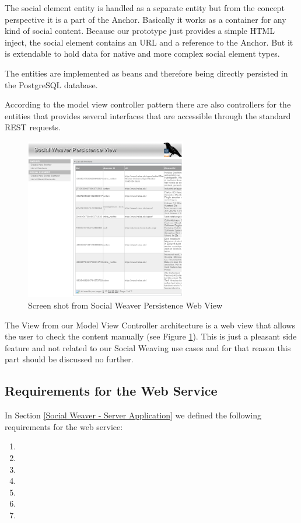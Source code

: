 The social element entity is handled as a separate entity but from the concept perspective it is a part of the Anchor. Basically it works as a container for any kind of social content. Because our prototype just provides a simple HTML inject, the social element contains an URL and a reference to the Anchor. But it is extendable to hold data for native and more complex social element types. 

The entities are implemented as beans and therefore being directly persisted in the PostgreSQL database.

According to the model view controller pattern there are also controllers for the entities that provides several interfaces that are accessible through the standard REST requests. 

\begin{figure}\centering
		\includegraphics[width=7cm]{images/sowe-mvc-view-screenshot.png}
		\caption{Screen shot from Social Weaver Persistence Web View}
		\label{sowe-mvc-view-screenshot}
\end{figure} 

The View from our Model View Controller architecture is a web view that allows the user to check the content manually (see Figure \ref{sowe-mvc-view-screenshot}). This is just a pleasant side feature and not related to our Social Weaving use cases and for that reason this part should be discussed no further.

\newpage
\subsection{Requirements for the Web Service}
In Section \ref{Social Weaver - Server Application} we defined the following requirements for the web service:

\begin{enumerate}
\item \reqWSi
\item \reqWSii
\item \reqWSiii
\item \reqWSiv
\item \reqWSv
\item \reqWSvi
\item \reqWSvii
\end{enumerate}

